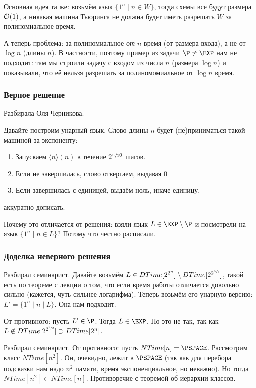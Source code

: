 		Основная идея та же: возьмём язык $\{1^n \mid n \in W\}$, тогда схемы все будут размера $\mathcal O(1)$,
		а никакая машина Тьюринга не должна будет иметь разрешать $W$ за полиномиальное время.

		А теперь проблема: за полиномиальное \textit{от $n$} время (от размера входа),
		а не от $\log n$ (длины $n$).
		В частности, поэтому пример из задачи $\P \neq \EXP$ нам не подходит:
		там мы строили задачу с входом из числа $n$ (размера $\log n$) и показывали,
		что её нельзя разрешать за полиномомиальное от $\log n$ время.

	\subsubsection{Верное решение}
		Разбирала Оля Черникова.

		Давайте построим унарный язык.
		Слово длины $n$ будет (не)приниматься такой машиной за экспоненту:
		\begin{enumerate}
			\item
				Запускаем $\langle n \rangle (n)$ в течение $2^{\sfrac n 10}$ шагов.
			\item
				Если не завершилась, слово отвергаем, выдавая 0
			\item
				Если завершилась с единицей, выдаём ноль, иначе единицу.
		\end{enumerate}
		\TODO аккуратно дописать.

		\begin{Rem}
			\TODO Почему это отличается от решения: взяли язык $L \in \EXP \setminus \P$ и посмотрели на язык $\{1^n \mid n \in L\}$?
			Потому что честно расписали.
		\end{Rem}

	\subsubsection{Доделка неверного решения}
		Разбирал семинарист.
		Давайте возьмём $L \in DTime[2^{2^n}] \setminus DTime[2^{2^{\sfrac n2}}]$,
		такой есть по теореме с лекции о том, что если время работы отличается довольно
		сильно (кажется, чуть сильнее логарифма).
		Теперь возьмём его унарную версию: $L' = \{ 1^n \mid n \mid L\}$.
		Она нам подходит.

		От противного: пусть $L' \in \P$.
		Тогда $L \in \EXP$.
		Но это не так, так как $L \notin DTime[2^{2^{\sfrac n2}}] \supset DTime[2^n]$.
		\TODO

	Разбирал семинарист.
	От противного: пусть $NTime[n] = \PSPACE$.
	Рассмотрим класс $NTime[n^2]$.
	Он, очевидно, лежит в $\PSPACE$ (так как для перебора подсказки нам надо $n^2$
	памяти, время экспоненциальное, но неважно).
	Но тогда $NTime[n^2] \subset NTime[n]$.
	Противоречие с теоремой об иерархии классов.

